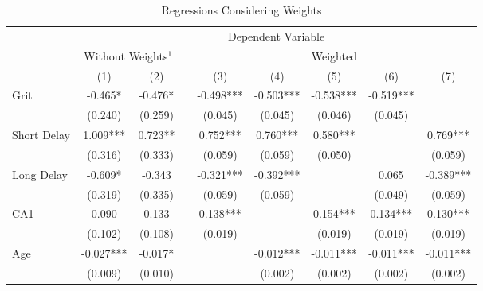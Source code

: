 \begin{sidewaystable}[p]
\centering
\caption{Regressions Considering Weights}
\label{tab:reg3}
\begin{tabular}{lcclccccc}
\hline
\multicolumn{1}{c}{} & \multicolumn{8}{c}{Dependent Variable}                                                                   \\ \cline{2-9} 
                     & \multicolumn{2}{c}{Without Weights\(^1\)} &  & \multicolumn{5}{c}{Weighted}                              \\ \cline{2-3} \cline{5-9} 
                     & (1)                 & (2)                 &  & (3)       & (4)       & (5)       & (6)       & (7)       \\ \hline
Grit                 & -0.465*             & -0.476*             &  & -0.498*** & -0.503*** & -0.538*** & -0.519*** &           \\
                     & (0.240)             & (0.259)             &  & (0.045)   & (0.045)   & (0.046)   & (0.045)   &           \\
Short Delay          & 1.009***            & 0.723**             &  & 0.752***  & 0.760***  & 0.580***  &           & 0.769***  \\
                     & (0.316)             & (0.333)             &  & (0.059)   & (0.059)   & (0.050)   &           & (0.059)   \\
Long Delay           & -0.609*             & -0.343              &  & -0.321*** & -0.392*** &           & 0.065     & -0.389*** \\
                     & (0.319)             & (0.335)             &  & (0.059)   & (0.059)   &           & (0.049)   & (0.059)   \\
CA1                  & 0.090               & 0.133               &  & 0.138***  &           & 0.154***  & 0.134***  & 0.130***  \\
                     & (0.102)             & (0.108)             &  & (0.019)   &           & (0.019)   & (0.019)   & (0.019)   \\
Age                  & -0.027***           & -0.017*             &  &           & -0.012*** & -0.011*** & -0.011*** & -0.011*** \\
                     & (0.009)             & (0.010)             &  &           & (0.002)   & (0.002)   & (0.002)   & (0.002)   \\

\end{tabular}
\end{sidewaystable}
